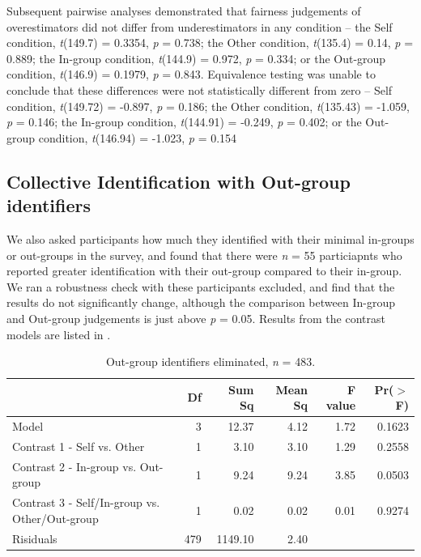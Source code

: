 \documentclass[12pt,]{article}
\begin{document}
Subsequent pairwise analyses demonstrated that fairness judgements of overestimators did not differ from underestimators in any condition -- the Self condition, \emph{t}(149.7) = 0.3354, \emph{p} = 0.738; the Other condition, \emph{t}(135.4) = 0.14, \emph{p} = 0.889; the In-group condition, \emph{t}(144.9) = 0.972, \emph{p} = 0.334; or the Out-group condition, \emph{t}(146.9) = 0.1979, \emph{p} = 0.843. Equivalence testing was unable to conclude that these differences were not statistically different from zero -- Self condition,  \emph{t}(149.72) = -0.897, \emph{p} = 0.186; the Other condition, \emph{t}(135.43) = -1.059, \emph{p} = 0.146; the In-group condition, \emph{t}(144.91) = -0.249, \emph{p} = 0.402; or the Out-group condition, \emph{t}(146.94) = -1.023, \emph{p} = 0.154



\clearpage
\subsection{Collective Identification with Out-group identifiers}
\label{appendix:CID1}


We also asked participants how much they identified with their minimal in-groups or out-groups in the survey, and found that there were \emph{n} = 55 particiapnts who reported greater identification with their out-group compared to their in-group. We ran a robustness check with these participants excluded, and find that the results do not significantly change, although the comparison between In-group and Out-group judgements is just above \emph{p} = 0.05. Results from the contrast models are listed in . 

\begin{table}[ht]
\centering
\begin{tabular}{lrrrrr}
  \hline
 & Df & Sum Sq & Mean Sq & F value & Pr($>$F) \\ 
  \hline
Model & 3 & 12.37 & 4.12 & 1.72 & 0.1623 \\ 
  Contrast 1 - Self vs. Other & 1 & 3.10 & 3.10 & 1.29 & 0.2558 \\ 
  Contrast 2 - In-group vs. Out-group & 1 & 9.24 & 9.24 & 3.85 & 0.0503 \\ 
  Contrast 3 - Self/In-group vs. Other/Out-group & 1 & 0.02 & 0.02 & 0.01 & 0.9274 \\ 
  Risiduals & 479 & 1149.10 & 2.40 &  &  \\ 
   \hline
\end{tabular}
\caption{Out-group identifiers eliminated, \emph{n} = 483. } 
\label{mismatch1}
\end{table}
\end{document}
